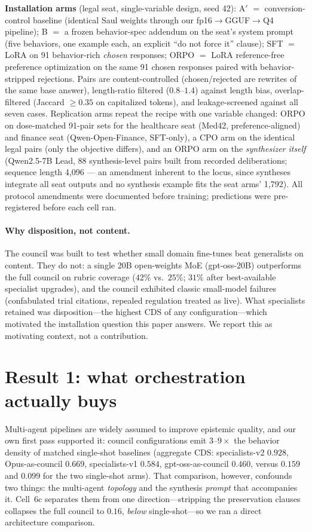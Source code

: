 \documentclass[11pt]{article}
\begin{document}
\textbf{Installation arms} (legal seat, single-variable design, seed 42): $\text{A}'$ $=$ conversion-control baseline (identical Saul weights through our fp16$\to$GGUF$\to$Q4 pipeline); B $=$ a frozen behavior-spec addendum on the seat's system prompt (five behaviors, one example each, an explicit ``do not force it'' clause); SFT $=$ LoRA on 91 behavior-rich \emph{chosen} responses; ORPO $=$ LoRA reference-free preference optimization on the same 91 chosen responses paired with behavior-stripped rejections. Pairs are content-controlled (chosen/rejected are rewrites of the same base answer), length-ratio filtered ($0.8$--$1.4$) against length bias, overlap-filtered (Jaccard $\ge 0.35$ on capitalized tokens), and leakage-screened against all seven cases. Replication arms repeat the recipe with one variable changed: ORPO on dose-matched 91-pair sets for the healthcare seat (Med42, preference-aligned) and finance seat (Qwen-Open-Finance, SFT-only), a CPO arm on the identical legal pairs (only the objective differs), and an ORPO arm on the \emph{synthesizer itself} (Qwen2.5-7B Lead, 88 synthesis-level pairs built from recorded deliberations; sequence length 4{,}096 --- an amendment inherent to the locus, since syntheses integrate all seat outputs and no synthesis example fits the seat arms' 1{,}792). All protocol amendments were documented before training; predictions were pre-registered before each cell ran.

\paragraph{Why disposition, not content.} The council was built to test whether small domain fine-tunes beat generalists on content. They do not: a single 20B open-weights MoE (gpt-oss-20B) outperforms the full council on rubric coverage ($42\%$ vs.\ $25\%$; $31\%$ after best-available specialist upgrades), and the council exhibited classic small-model failures (confabulated trial citations, repealed regulation treated as live). What specialists retained was disposition---the highest CDS of any configuration---which motivated the installation question this paper answers. We report this as motivating context, not a contribution.

\section{Result 1: what orchestration actually buys}
\label{sec:arch}
Multi-agent pipelines are widely assumed to improve epistemic quality, and our
own first pass supported it: council configurations emit $3$--$9\times$ the
behavior density of matched single-shot baselines (aggregate CDS: specialists-v2
$0.928$, Opus-as-council $0.669$, specialists-v1 $0.584$, gpt-oss-as-council
$0.460$, versus $0.159$ and $0.099$ for the two single-shot arms). That
comparison, however, confounds two things: the multi-agent \emph{topology} and
the synthesis \emph{prompt} that accompanies it. Cell~6c separates them from one
direction---stripping the preservation clauses collapses the full council to
$0.16$, \emph{below} single-shot---so we ran a direct architecture comparison.
\end{document}
